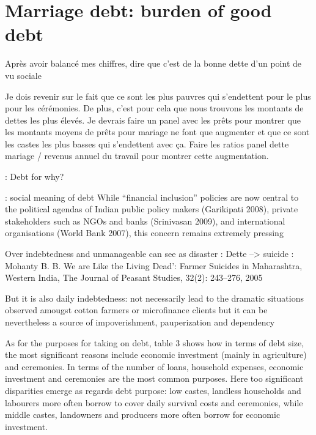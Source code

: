 \documentclass[a4paper, 11pt, onecolumn]{article}
\begin{document}
\section{Marriage debt: burden of good debt}

Après avoir balancé mes chiffres, dire que c'est de la bonne dette d'un point de vu sociale

Je dois revenir sur le fait que ce sont les plus pauvres qui s'endettent pour le plus pour les cérémonies. De plus, c'est pour cela que nous trouvons les montants de dettes les plus élevés.
Je devrais faire un panel avec les prêts pour montrer que les montants moyens de prêts pour mariage ne font que augmenter et que ce sont les castes les plus basses qui s'endettent avec ça.
Faire les ratios panel dette mariage / revenus annuel du travail pour montrer cette augmentation.


\cite{Guerin2012} : Debt for why?



\cite{Guerin2014a} : social meaning of debt
While “financial inclusion” policies are now central to the political agendas of Indian public
policy makers (Garikipati 2008), private stakeholders such as NGOs and banks (Srinivasan
2009), and international organisations (World Bank 2007), this concern remains extremely
pressing

Over indebtedness and unmanageable can see as disaster : 
Dette --> suicide : Mohanty B. B. We are Like the Living Dead’: Farmer Suicides in Maharashtra, Western India, The Journal
of Peasant Studies, 32(2): 243–276, 2005

But it is also daily indebtedness: not necessarily lead to the dramatic situations observed amougst cotton farmers or microfinance clients but it can be nevertheless a source of impoverishment, pauperization and dependency \citep{Guerin2014a}

As for
the purposes for taking on debt, table 3 shows how in terms of debt size, the most significant
reasons include economic investment (mainly in agriculture) and ceremonies. In terms of the
number of loans, household expenses, economic investment and ceremonies are the most
common purposes. Here too significant disparities emerge as regards debt purpose: low castes, landless households and labourers more often borrow to cover daily survival costs and
ceremonies, while middle castes, landowners and producers more often borrow for economic
investment.
\end{document}

